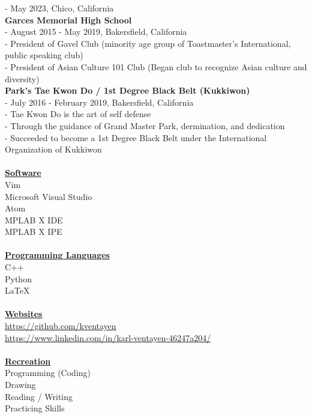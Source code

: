 \documentclass[10pt, letterpaper]{article}                %
\begin{document}
\tab \tab - May 2023, Chico, California\\
\textbf{Garces Memorial High School}\\
\tab \tab - August 2015 - May 2019, Bakersfield, California\\
\tab \tab - President of Gavel Club (minority age group of Toastmaster's International, public speaking club)\\
\tab \tab - President of Asian Culture 101 Club (Began club to recognize Asian culture and diversity)\\
\textbf{Park's Tae Kwon Do / 1st Degree Black Belt (Kukkiwon)}\\
\tab \tab - July 2016 - February 2019, Bakersfield, California\\
\tab \tab - Tae Kwon Do is the art of self defense\\
\tab \tab - Through the guidance of Grand Master Park, dermination, and dedication\\
\tab \tab - Succeeded to become a 1st Degree Black Belt under the International Organization of Kukkiwon\\
\\
\textbf{\underline{Software}}\\
Vim\\
Microsoft Visual Studio\\
Atom\\
MPLAB X IDE\\
MPLAB X IPE\\
\\
\textbf{\underline{Programming Languages}}\\
C++\\
Python\\
LaTeX\\
\\
\textbf{\underline{Websites}}\\
\url{https://github.com/kventayen}\\
\url{https://www.linkedin.com/in/karl-ventayen-46247a204/}\\
\\
\textbf{\underline{Recreation}}\\
Programming (Coding)\\
Drawing\\
Reading / Writing\\
Practicing Skills
\end{document}
